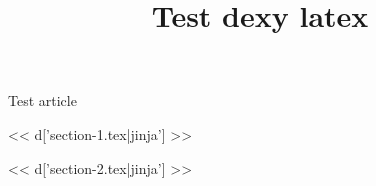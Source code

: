 \title{
Test dexy latex}



\maketitle

Test article

<< d['section-1.tex|jinja'] >>

<< d['section-2.tex|jinja'] >>
